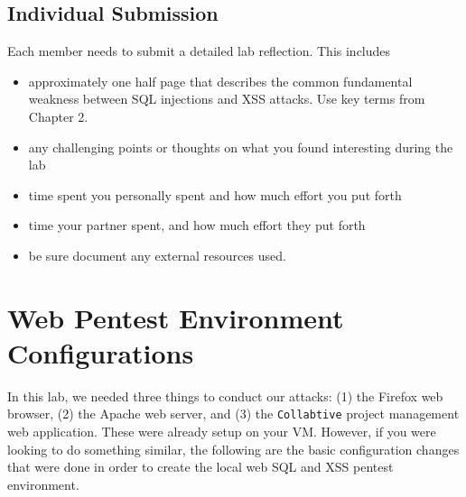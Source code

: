 \documentclass{article}
\begin{document}
\subsection{Individual Submission}
Each member needs to submit a detailed lab reflection. This includes 
\begin{itemize}
\item approximately one half page that describes the common fundamental weakness between SQL injections and XSS attacks.  Use key terms from Chapter 2. 
\item any challenging points or thoughts on what you found interesting during the lab 
\item time spent you personally spent and how much effort you put forth
\item time your partner spent, and how much effort they put forth
\item be sure document any external resources used. 
\end{itemize}



\newpage
\appendix

\section{Web Pentest Environment Configurations} 
\label{sec:cheatsheet}

In this lab, we needed three things to conduct our attacks: (1) the Firefox web browser,
(2) the Apache web server, and (3) the {\tt Collabtive} project management
web application. These were already setup on your VM. However, if you were looking to do something similar, the following are the basic configuration changes that were done in order to create the local web SQL and XSS pentest environment.

\end{document}
